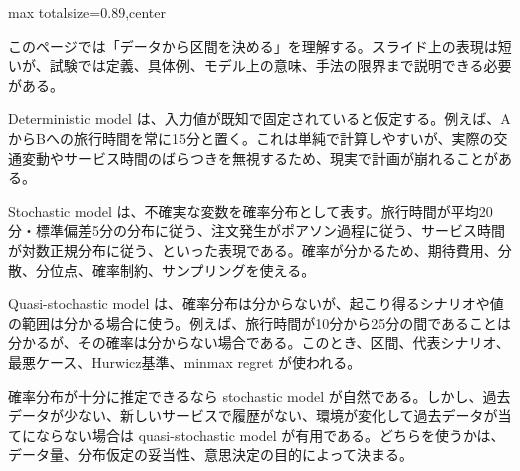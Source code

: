 \begin{minipage}[t]{0.58\textwidth}
\begin{adjustbox}{max totalsize={\textwidth}{0.89\textheight},center}
\begin{minipage}{\textwidth}\scriptsize
{}このページでは「データから区間を決める」を理解する。スライド上の表現は短いが、試験では定義、具体例、モデル上の意味、手法の限界まで説明できる必要がある。\par
Deterministic model は、入力値が既知で固定されていると仮定する。例えば、AからBへの旅行時間を常に15分と置く。これは単純で計算しやすいが、実際の交通変動やサービス時間のばらつきを無視するため、現実で計画が崩れることがある。\par
Stochastic model は、不確実な変数を確率分布として表す。旅行時間が平均20分・標準偏差5分の分布に従う、注文発生がポアソン過程に従う、サービス時間が対数正規分布に従う、といった表現である。確率が分かるため、期待費用、分散、分位点、確率制約、サンプリングを使える。\par
Quasi-stochastic model は、確率分布は分からないが、起こり得るシナリオや値の範囲は分かる場合に使う。例えば、旅行時間が10分から25分の間であることは分かるが、その確率は分からない場合である。このとき、区間、代表シナリオ、最悪ケース、Hurwicz基準、minmax regret が使われる。\par
確率分布が十分に推定できるなら stochastic model が自然である。しかし、過去データが少ない、新しいサービスで履歴がない、環境が変化して過去データが当てにならない場合は quasi-stochastic model が有用である。どちらを使うかは、データ量、分布仮定の妥当性、意思決定の目的によって決まる。\par

\end{minipage}
\end{adjustbox}
\end{minipage}
